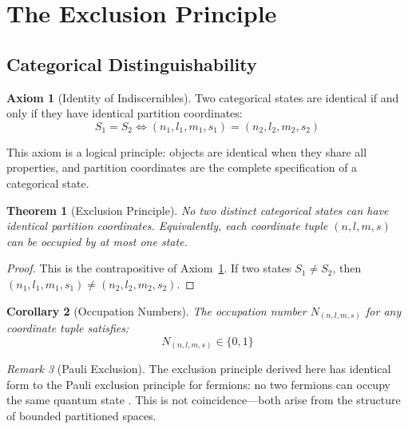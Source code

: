 \documentclass[twocolumn,10pt,a4paper]{article}
\newtheorem{theorem}{Theorem}[section]
\newtheorem{corollary}[theorem]{Corollary}
\theoremstyle{definition}
\newtheorem{axiom}{Axiom}
\theoremstyle{remark}
\newtheorem{remark}[theorem]{Remark}
\begin{document}
\section{The Exclusion Principle}
\label{sec:exclusion}

\subsection{Categorical Distinguishability}

\begin{axiom}[Identity of Indiscernibles]
\label{axiom:identity}
Two categorical states are identical if and only if they have identical partition coordinates:
\begin{equation}
    S_1 = S_2 \iff (n_1, l_1, m_1, s_1) = (n_2, l_2, m_2, s_2)
\end{equation}
\end{axiom}

This axiom is a logical principle: objects are identical when they share all properties, and partition coordinates are the complete specification of a categorical state.

\begin{theorem}[Exclusion Principle]
\label{thm:exclusion}
No two distinct categorical states can have identical partition coordinates. Equivalently, each coordinate tuple $(n, l, m, s)$ can be occupied by at most one state.
\end{theorem}

\begin{proof}
This is the contrapositive of Axiom~\ref{axiom:identity}. If two states $S_1 \neq S_2$, then $(n_1, l_1, m_1, s_1) \neq (n_2, l_2, m_2, s_2)$.
\end{proof}

\begin{corollary}[Occupation Numbers]
The occupation number $N_{(n,l,m,s)}$ for any coordinate tuple satisfies:
\begin{equation}
    N_{(n,l,m,s)} \in \{0, 1\}
\end{equation}
\end{corollary}

\begin{remark}[Pauli Exclusion]
The exclusion principle derived here has identical form to the Pauli exclusion principle for fermions: no two fermions can occupy the same quantum state \cite{pauli1925}. This is not coincidence---both arise from the structure of bounded partitioned spaces.
\end{remark}
\end{document}
